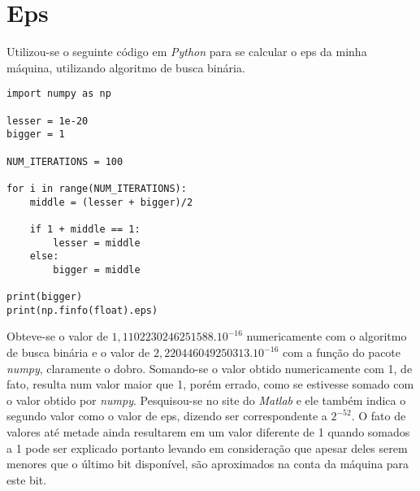 \documentclass{article}[twocolumn]
\begin{document}
	\section{Eps}
	Utilizou-se o seguinte c\'odigo em \textit{Python} para se calcular o eps da minha m\'aquina,
	utilizando algoritmo de busca bin\'aria.
	\begin{verbatim}
import numpy as np

lesser = 1e-20
bigger = 1

NUM_ITERATIONS = 100

for i in range(NUM_ITERATIONS):
    middle = (lesser + bigger)/2
    
    if 1 + middle == 1:
        lesser = middle
    else:
        bigger = middle

print(bigger)
print(np.finfo(float).eps)
	\end{verbatim}
	Obteve-se o valor de $1,1102230246251588.10^{-16}$ numericamente com o algoritmo de busca
	bin\'aria e o valor de $2,220446049250313.10^{-16}$ com a fun\c{c}\~ao do pacote
	\textit{numpy}, claramente o dobro. Somando-se o valor obtido numericamente com 1,
	de fato, resulta num valor maior que 1, por\'em errado, como se estivesse somado
	com o valor obtido por \textit{numpy}. Pesquisou-se no site do \textit{Matlab} e ele
	tamb\'em indica o segundo valor como o valor de eps, dizendo ser correspondente
	a $2^{-52}$. O fato de valores at\'e metade ainda resultarem em um valor diferente de
	1 quando somados a 1 pode ser explicado portanto levando em considera\c{c}\~ao que
	apesar deles serem menores que o \'ultimo bit dispon\'ivel, s\~ao aproximados
	na conta da m\'aquina para este bit.
\end{document}
